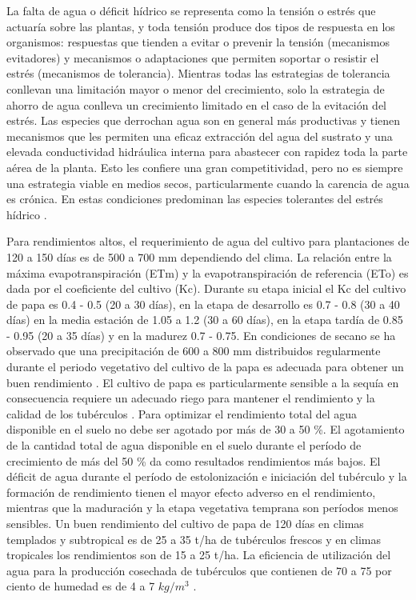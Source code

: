 \documentclass[fleqn,10pt]{Flavio}\usepackage[]{graphicx}\usepackage[]{color}
\begin{document}
La falta de agua o d\'eficit h\'idrico se representa como la tensi\'on o estr\'es que actuar\'ia sobre las plantas, y toda tensi\'on produce dos tipos de respuesta en los organismos: respuestas que tienden a evitar o prevenir la tensi\'on (mecanismos evitadores) y mecanismos o adaptaciones que permiten soportar o resistir el estr\'es (mecanismos de tolerancia). Mientras todas las estrategias de tolerancia conllevan una limitaci\'on mayor o menor del crecimiento, solo la estrategia de ahorro de agua conlleva un crecimiento limitado en el caso de la evitaci\'on del estr\'es. Las especies que derrochan agua son en general m\'as productivas y tienen mecanismos que les permiten una eficaz extracci\'on del agua del sustrato y una elevada conductividad hidr\'aulica interna para abastecer con rapidez toda la parte a\'erea de la planta. Esto les confiere una gran competitividad, pero no es siempre una estrategia viable en medios secos, particularmente cuando la carencia de agua es cr\'onica. En estas condiciones predominan las especies tolerantes del estr\'es h\'idrico \citep{Valladares2004}. 


Para rendimientos altos, el requerimiento de agua del cultivo para  plantaciones de 120 a 150 d\'ias es de 500 a 700 mm dependiendo del clima. La relaci\'on entre la m\'axima evapotranspiraci\'on (ETm) y la evapotranspiraci\'on de referencia (ETo) es dada por el coeficiente del cultivo (Kc). Durante su etapa inicial el Kc del cultivo de papa es 0.4 - 0.5 (20 a 30 d\'ias), en la etapa de desarrollo es 0.7 - 0.8 (30 a 40 d\'ias) en la media estaci\'on de 1.05 a 1.2 (30 a 60 d\'ias), en la etapa tard\'ia de 0.85 - 0.95 (20 a 35 d\'ias) y en la madurez 0.7 - 0.75. En condiciones de secano se ha observado que una precipitaci\'on de 600 a 800 mm distribuidos regularmente durante el periodo vegetativo del cultivo de la papa es adecuada para obtener un buen rendimiento \citep{Barrantes1993}. El cultivo de papa es particularmente sensible a la sequ\'ia \citep{Yuan2003} en consecuencia requiere un adecuado riego para mantener el rendimiento y la calidad de los tub\'erculos \citep{Porter1999,Fabeiro2001}. Para optimizar el rendimiento total del agua disponible en el suelo no debe ser agotado por m\'as de 30 a 50 \%. El agotamiento de la cantidad total de agua disponible en el suelo durante el per\'iodo de crecimiento de m\'as del 50 \% da como resultados rendimientos m\'as bajos. El d\'eficit de agua durante el per\'iodo de estolonizaci\'on e iniciaci\'on del tub\'erculo y la formaci\'on de rendimiento tienen el mayor efecto adverso en el rendimiento, mientras que la maduraci\'on  y la etapa vegetativa temprana son per\'iodos menos sensibles. Un buen rendimiento del cultivo de papa de 120 d\'ias en climas templados y subtropical es de 25 a 35 t/ha de tub\'erculos frescos y en climas tropicales los rendimientos son de 15 a 25 t/ha. La eficiencia de utilizaci\'on del agua para la producci\'on cosechada de tub\'erculos que contienen de 70 a 75 por ciento de humedad es de 4 a 7 $kg/m^3$ \citep{FAO18/06/14}.
\end{document}

